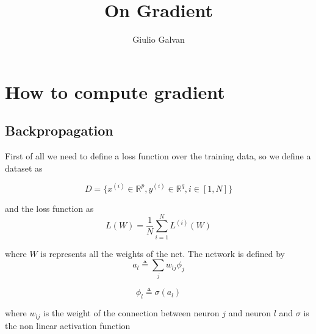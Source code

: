 \documentclass{article}
\title{On Gradient}
\author{Giulio Galvan}
\begin{document}
\maketitle

\begin{abstract}
\end{abstract}

\section{How to compute gradient}
\subsection{Backpropagation}

First of all we need to define a loss function over the training data, so we define a dataset as 

\begin{equation}
D=\{x^{(i)} \in \mathbb{R}^p, y^{(i)} \in \mathbb{R}^q,  i\in[1,N]\}
\end{equation}

and the loss function as
\begin{equation}
L(W)=\frac{1}{N}\sum_{i=1}^N L^{(i)}(W) 
\end{equation}

where $W$ is represents all the weights of the net.
The network is defined by
\begin{equation}
a_l \triangleq \sum_j w_{lj}\phi_j
\end{equation}

\begin{equation}
\phi_l \triangleq \sigma(a_l)
\end{equation}


where $w_{lj}$ is the weight of the connection between neuron $j$ and neuron $l$ and $\sigma$ is the non linear activation function
\end{document}
